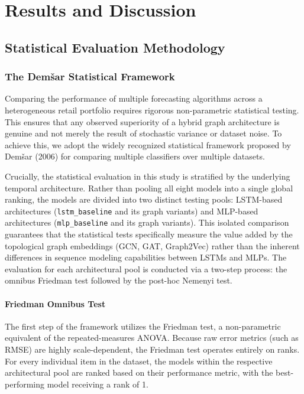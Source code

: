 \chapter{Results and Discussion}
\label{ch:results_and_discussion}



\section{Statistical Evaluation Methodology}
\label{sec:statistical_evaluation_methodology}

\subsection{The Dem\v{s}ar Statistical Framework}
\label{subsec:demsar_framework}

Comparing the performance of multiple forecasting algorithms across a heterogeneous retail portfolio requires rigorous non-parametric statistical testing. This ensures that any observed superiority of a hybrid graph architecture is genuine and not merely the result of stochastic variance or dataset noise. To achieve this, we adopt the widely recognized statistical framework proposed by Dem\v{s}ar (2006) for comparing multiple classifiers over multiple datasets.

Crucially, the statistical evaluation in this study is stratified by the underlying temporal architecture. Rather than pooling all eight models into a single global ranking, the models are divided into two distinct testing pools: LSTM-based architectures (\texttt{lstm\_baseline} and its graph variants) and MLP-based architectures (\texttt{mlp\_baseline} and its graph variants). This isolated comparison guarantees that the statistical tests specifically measure the value added by the topological graph embeddings (GCN, GAT, Graph2Vec) rather than the inherent differences in sequence modeling capabilities between LSTMs and MLPs. The evaluation for each architectural pool is conducted via a two-step process: the omnibus Friedman test followed by the post-hoc Nemenyi test.

\subsubsection{Friedman Omnibus Test}
\label{subsubsec:friedman_test}

The first step of the framework utilizes the Friedman test, a non-parametric equivalent of the repeated-measures ANOVA. Because raw error metrics (such as RMSE) are highly scale-dependent, the Friedman test operates entirely on ranks. For every individual item in the dataset, the models within the respective architectural pool are ranked based on their performance metric, with the best-performing model receiving a rank of 1. 

